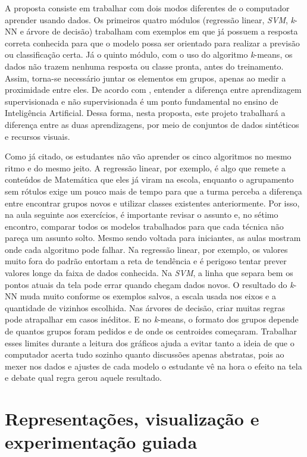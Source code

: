 A proposta consiste em trabalhar com dois modos diferentes de o computador aprender usando dados. Os primeiros quatro módulos (regressão linear, \textit{SVM}, \textit{k}-NN e árvore de decisão) trabalham com exemplos em que já possuem a resposta correta conhecida para que o modelo possa ser orientado para realizar a previsão ou classificação certa. Já o quinto módulo, com o uso do algoritmo \textit{k}-means, os dados não trazem nenhuma resposta ou classe pronta, antes do treinamento. Assim, torna-se necessário juntar os elementos em grupos, apenas ao medir a proximidade entre eles. De acordo com , entender a diferença entre aprendizagem supervisionada e não supervisionada é um ponto fundamental no ensino de Inteligência Artificial. Dessa forma, nesta proposta, este projeto trabalhará a diferença entre as duas aprendizagens, por meio de conjuntos de dados sintéticos e recursos visuais.

Como já citado, os estudantes não vão aprender os cinco algoritmos no mesmo ritmo e do mesmo jeito. A regressão linear, por exemplo, é algo que remete a conteúdos de Matemática que eles já viram na escola, enquanto o agrupamento sem rótulos exige um pouco mais de tempo para que a turma perceba a diferença entre encontrar grupos novos e utilizar classes existentes anteriormente. Por isso, na aula seguinte aos exercícios, é importante revisar o assunto e, no sétimo encontro, comparar todos os modelos trabalhados para que cada técnica não pareça um assunto solto. Mesmo sendo voltada para iniciantes, as aulas mostram onde cada algoritmo pode falhar. Na regressão linear, por exemplo, os valores muito fora do padrão entortam a reta de tendência e é perigoso tentar prever valores longe da faixa de dados conhecida. Na \textit{SVM}, a linha que separa bem os pontos atuais da tela pode errar quando chegam dados novos. O resultado do \textit{k}-NN muda muito conforme os exemplos salvos, a escala usada nos eixos e a quantidade de vizinhos escolhida. Nas árvores de decisão, criar muitas regras pode atrapalhar em casos inéditos. E no \textit{k}-means, o formato dos grupos depende de quantos grupos foram pedidos e de onde os centroides começaram. Trabalhar esses limites durante a leitura dos gráficos ajuda a evitar tanto a ideia de que o computador acerta tudo sozinho quanto discussões apenas abstratas, pois ao mexer nos dados e ajustes de cada modelo o estudante vê na hora o efeito na tela e debate qual regra gerou aquele resultado.

\section{Representações, visualização e experimentação guiada}

